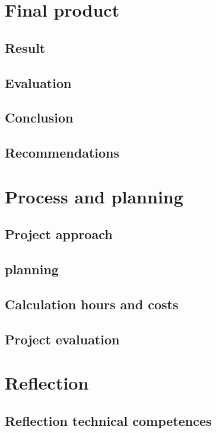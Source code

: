 \documentclass[12pt,a4paper]{report}
\begin{document}
\chapter{Final product}
\section{Result}

\section{Evaluation}

\section{Conclusion}

\section{Recommendations}

\chapter{Process and planning}
\section{Project  approach}

\section{planning}

\section{Calculation hours and costs}

\section{Project evaluation}

\chapter{Reflection}
\section{Reflection technical competences}
\end{document}
